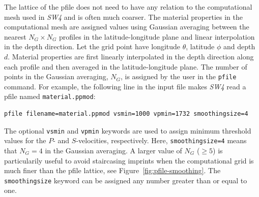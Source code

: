 \documentclass[11pt]{report}
\begin{document}
The lattice of the pfile does not need to have any relation to the computational mesh used in
\emph{SW4} and is often much coarser. The material properties in the computational mesh are assigned
values using Gaussian averaging between the nearest $N_G\times N_G$ profiles in the
latitude-longitude plane and linear interpolation in the depth direction. Let the grid point have
longitude $\theta$, latitude $\phi$ and depth $d$. Material properties are first linearly
interpolated in the depth direction along each profile and then averaged in the latitude-longitude
plane. The number of points in the Gaussian averaging, $N_G$, is assigned by the user in the
\verb+pfile+ command. For example, the following line in the input file makes \emph{SW4} read a
pfile named \verb+material.ppmod+:
\begin{verbatim}
pfile filename=material.ppmod vsmin=1000 vpmin=1732 smoothingsize=4
\end{verbatim}
The optional \verb+vsmin+ and \verb+vpmin+ keywords are used to assign minimum threshold values for
the $P$- and $S$-velocities, respectively. Here, {\tt smoothingsize=4} means that $N_G=4$ in the
Gaussian averaging. A larger value of $N_G$ ($\geq 5$) is particularily useful to avoid staircasing
imprints when the computational grid is much finer than the pfile lattice, see
Figure~\ref{fig:pfile-smoothing}. The {\tt smoothingsize} keyword can be assigned any number greater
than or equal to one.
\end{document}
